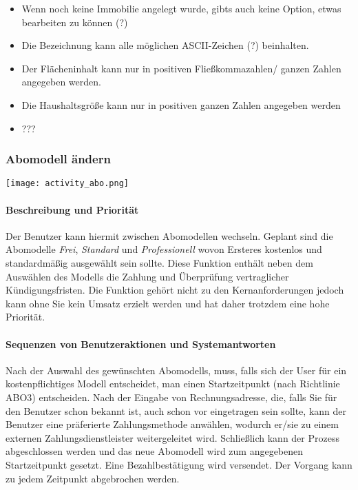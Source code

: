 \begin{itemize}
	\item Wenn noch keine Immobilie angelegt wurde, gibts auch keine Option, etwas bearbeiten zu können (?)
	\item Die Bezeichnung kann alle möglichen ASCII-Zeichen (?) beinhalten.
	\item Der Flächeninhalt kann nur in positiven Fließkommazahlen/ ganzen Zahlen angegeben werden.
	\item Die Haushaltsgröße kann nur in positiven ganzen Zahlen angegeben werden
	\item ???
\end{itemize}

\subsubsection{Abomodell ändern}
\texttt{[image: activity\_abo.png]}


\paragraph{Beschreibung und Priorität}
Der Benutzer kann hiermit zwischen Abomodellen wechseln. Geplant sind die Abomodelle \textit{Frei}, \textit{Standard} und \textit{Professionell} wovon Ersteres kostenlos und standardmäßig ausgewählt sein sollte. Diese Funktion enthält neben dem Auswählen des Modells die Zahlung und Überprüfung vertraglicher Kündigungsfristen. Die Funktion gehört nicht zu den Kernanforderungen jedoch kann ohne Sie kein Umsatz erzielt werden und hat daher trotzdem eine hohe Priorität.
\paragraph{Sequenzen von Benutzeraktionen und Systemantworten}
Nach der Auswahl des gewünschten Abomodells, muss, falls sich der User für ein kostenpflichtiges Modell entscheidet, man einen Startzeitpunkt (nach Richtlinie ABO3) entscheiden. Nach der Eingabe von Rechnungsadresse, die, falls Sie für den Benutzer schon bekannt ist, auch schon vor eingetragen sein sollte, kann der Benutzer eine präferierte Zahlungsmethode anwählen, wodurch er/sie zu einem externen Zahlungsdienstleister weitergeleitet wird. Schließlich kann der Prozess abgeschlossen werden und das neue Abomodell wird zum angegebenen Startzeitpunkt gesetzt. Eine Bezahlbestätigung wird versendet. Der Vorgang kann zu jedem Zeitpunkt abgebrochen werden.

